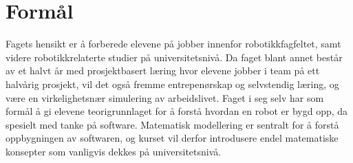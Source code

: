 \section*{Formål} \label{Sec: Formaal}


	Fagets hensikt er å forberede elevene på jobber innenfor robotikkfagfeltet, samt videre robotikkrelaterte studier på universitetsnivå. Da faget blant annet består av et halvt år med prosjektbasert læring hvor elevene jobber i team på ett halvårig prosjekt, vil det også fremme entrepenørskap og selvstendig læring, og være en virkelighetsnær simulering av arbeidslivet.
	Faget i seg selv har som formål å gi elevene teorigrunnlaget for å forstå hvordan en robot er bygd opp, da spesielt med tanke på software. Matematisk modellering er sentralt for å forstå oppbygningen av softwaren, og kurset vil derfor introdusere endel matematiske konsepter som vanligvis dekkes på universitetsnivå.
